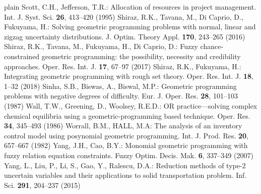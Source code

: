 \begin{thebibliography}{plain}
 Scott, C.H., Jefferson, T.R.: Allocation of resources in project management. Int. J. Syst. Sci. {\bf 26}, 413--420 (1995)
 Shiraz, R.K., Tavana, M., Di Caprio, D., Fukuyama, H.: Solving geometric programming problems with normal, linear and zigzag uncertainty distributions. J. Optim. Theory Appl. {\bf 170}, 243--265 (2016)
 Shiraz, R.K., Tavana, M., Fukuyama, H., Di Caprio, D.: Fuzzy chance-constrained geometric programming: the possibility, necessity and credibility approaches. Oper. Res. Int. J. {\bf 17}, 67--97 (2017)
 Shiraz, R.K., Fukuyama, H.: Integrating geometric programming with rough set theory. Oper. Res. Int. J. {\bf 18}, 1--32 (2018)
 Sinha, S.B., Biswas, A., Biswal, M.P.: Geometric programming problems with negative degrees of difficulty. Eur. J. Oper. Res. {\bf 28}, 101--103 (1987)
 Wall, T.W., Greening, D., Woolsey, R.E.D.: OR practice—solving complex chemical equilibria using a geometric-programming based technique. Oper. Res. {\bf 34}, 345--493 (1986)
 Worrall, B.M., HALL, M.A: The analysis of an inventory control model using posynomial geometric programming. Int. J. Prod. Res. {\bf 20}, 657--667 (1982)
 Yang, J.H., Cao, B.Y.: Monomial geometric programming with fuzzy relation equation constraints. Fuzzy Optim. Decis. Mak. {\bf 6}, 337--349 (2007)
 Yang, L., Liu, P., Li, S., Gao, Y., Ralescu, D.A.: Reduction methods of type-2 uncertain variables and their applications to solid transportation problem. Inf. Sci. {\bf 291}, 204--237 (2015)
\end{thebibliography}




